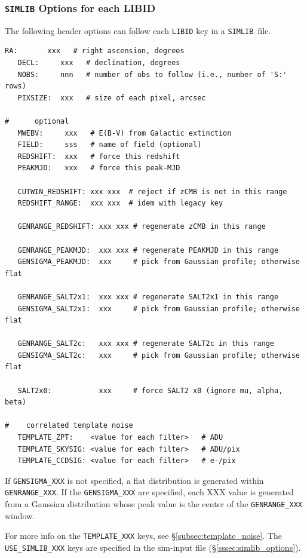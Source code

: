 \documentclass[12pt]{article}
\newcommand{\simlib}{{\tt SIMLIB}}
\begin{document}
{%
\clearpage
\subsubsection{{\simlib} Options for each LIBID}
\label{sssec:libid_options}

The following header options can follow each {\tt LIBID} key 
in a \simlib\ file.

\begin{Verbatim}[frame=single]
   RA:       xxx   # right ascension, degrees
   DECL:     xxx   # declination, degrees
   NOBS:     nnn   # number of obs to follow (i.e., number of 'S:' rows)
   PIXSIZE:  xxx   # size of each pixel, arcsec

#      optional
   MWEBV:     xxx   # E(B-V) from Galactic extinction
   FIELD:     sss   # name of field (optional)
   REDSHIFT:  xxx   # force this redshift 
   PEAKMJD:   xxx   # force this peak-MJD 

   CUTWIN_REDSHIFT: xxx xxx  # reject if zCMB is not in this range
   REDSHIFT_RANGE:  xxx xxx  # idem with legacy key

   GENRANGE_REDSHIFT: xxx xxx # regenerate zCMB in this range

   GENRANGE_PEAKMJD:  xxx xxx # regenerate PEAKMJD in this range
   GENSIGMA_PEAKMJD:  xxx     # pick from Gaussian profile; otherwise flat

   GENRANGE_SALT2x1:  xxx xxx # regenerate SALT2x1 in this range
   GENSIGMA_SALT2x1:  xxx     # pick from Gaussian profile; otherwise flat

   GENRANGE_SALT2c:   xxx xxx # regenerate SALT2c in this range
   GENSIGMA_SALT2c:   xxx     # pick from Gaussian profile; otherwise flat

   SALT2x0:           xxx     # force SALT2 x0 (ignore mu, alpha, beta)

#    correlated template noise
   TEMPLATE_ZPT:    <value for each filter>   # ADU     
   TEMPLATE_SKYSIG: <value for each filter>   # ADU/pix 
   TEMPLATE_CCDSIG: <value for each filter>   # e-/pix  
\end{Verbatim}
%
\noindent
If {\tt GENSIGMA\_XXX} is not specified, a flat distribution is generated
within {\tt GENRANGE\_XXX}.
If the {\tt GENSIGMA\_XXX} are specified, each XXX value
is generated from a Gaussian distribution whose peak value
is the center of the {\tt GENRANGE\_XXX} window.

For more info on the {\tt TEMPLATE\_XXX} keys, 
see \S\ref{subsec:template_noise}. 
The {\tt USE\_SIMLIB\_XXX} keys are specified in the sim-input file
(\S\ref{sssec:simlib_options}).

}
\end{document}
